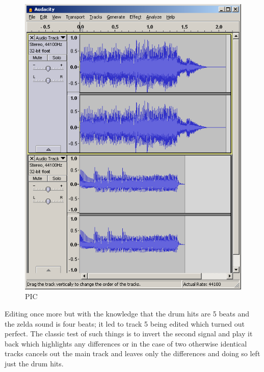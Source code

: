 \documentclass[
]{book}
\begin{document}
\begin{figure}
\centering
\includegraphics{images/155_home_fast6191_romhackingguide_unrenamed_fil___original_borders_romhackguideSDATSSEQedit_3.png}
\caption{PIC}
\end{figure}

Editing once more but with the knowledge that the drum hits are 5 beats and the zelda sound is four beats; it led to track 5 being edited which turned out perfect. The classic test of such things is to invert the second signal and play it back which highlights any differences or in the case of two otherwise identical tracks cancels out the main track and leaves only the differences and doing so left just the drum hits.
\end{document}

